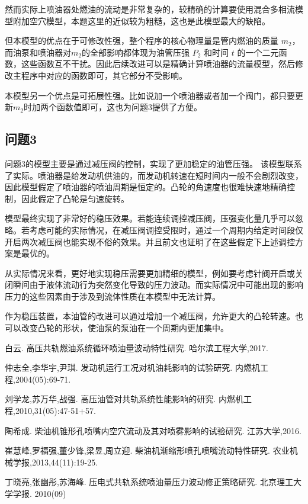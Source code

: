\documentclass[withoutpreface,bwprint]{cumcmthesis}
\begin{document}
	然而实际上喷油器处燃油的流动是非常复杂的，较精确的计算要使用混合多相流模型附加空穴模型\cite{模型评价1}，本题这里的近似较为粗糙，这也是此模型最大的缺陷。
	
	但本模型的优点在于可修改性强，整个程序的核心物理量是管内燃油的质量 $m_2$，而油泵和喷油器对$m_2$的全部影响都体现为油管压强 $P_2$ 和时间 $t$ 的一个二元函数，这些函数互不干扰。因此后续改进可以是精确计算喷油器的流量模型，然后修改主程序中对应的函数即可，其它部分不受影响。
	
	本模型另一个优点是可拓展性强。比如说加一个喷油器或者加一个阀门，都只要更新$m_2$时加两个函数值即可，这也为问题3提供了方便。
\subsection{问题3}
	问题3的模型主要是通过减压阀的控制，实现了更加稳定的油管压强。
	该模型联系了实际。喷油器是给发动机供油的，而发动机转速在短时间内一般不会剧烈改变，因此模型假定了喷油器的喷油周期是恒定的。凸轮的角速度也很难快速地精确控制，因此假定了凸轮是匀速旋转。
	
	模型最终实现了非常好的稳压效果。若能连续调控减压阀，压强变化量几乎可以忽略。若考虑可能的实际情况，在减压阀调控受限时，通过一个周期内给定时间段仅开启两次减压阀也能实现不俗的效果。并且前文也证明了在这些假定下上述调控方案是最优的。
	
	从实际情况来看，更好地实现稳压需要更加精细的模型，例如要考虑针阀开启或关闭瞬间由于液体流动行为突然变化导致的压力波动。而实际情况中可能出现的影响压力的这些因素由于涉及到流体性质在本模型中无法计算。
  
	作为稳压装置，本油管的改进可以通过增加一个减压阀，允许更大的凸轮转速。也可以改变凸轮的形状，使油泵的泵油在一个周期内更加集中。

\newpage

\begin{thebibliography}{9}%
    白云.
    \newblock 高压共轨燃油系统循环喷油量波动特性研究\allowbreak[D].
    \newblock 哈尔滨工程大学,2017.

    仲志全,李华宇,尹琪.
    \newblock 发动机运行工况对机油耗影响的试验研究\allowbreak[J].
    \newblock 内燃机工程,2004(05):69-71.

    刘学龙,苏万华,战强.
    \newblock 高压油管对共轨系统性能影响的研究\allowbreak[J].
    \newblock 内燃机工程,2010,31(05):47-51+57.

    陶希成.
    \newblock 柴油机锥形孔喷嘴内空穴流动及其对喷雾影响的试验研究\allowbreak[D].
    \newblock 江苏大学,2016.

    崔慧峰,罗福强,董少锋,梁昱,周立迎.
    \newblock 柴油机渐缩形喷孔喷嘴流动特性研究\allowbreak[J].
    \newblock 农业机械学报,2013,44(11):19-25.

    丁晓亮,张幽彤,苏海峰. 
    \newblock 压电式共轨系统喷油量压力波动修正策略研究\allowbreak[J].
    \newblock 北京理工大学学报. 2010(09)
\end{thebibliography}
\end{document}
